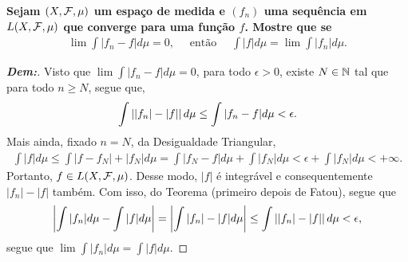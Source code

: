 \textbf{Sejam $(X, \mathcal F, \mu)$ um espaço de medida e $(f_n)$ uma sequência em 
$L(X, \mathcal F, \mu)$ que converge para uma função $f$. Mostre que se 
\begin{align*}
  \lim \int |f_n - f| d\mu = 0, \quad\text{ então }\quad \int |f| d\mu = \lim \int |f_n|d\mu.
\end{align*}}
\begin{proof}[\textbf{Dem:}] Visto que $\lim \int |f_n - f| d\mu = 0$, 
  para todo $\epsilon>0$, existe $N \in \mathbb N$ tal que para todo $n \ge N$,
  segue que, 
  \begin{align*}
    \int \left||f_n| - |f|\right| d\mu\le \int |f_n - f| d\mu < \epsilon.
  \end{align*}
  Mais ainda, fixado $n = N$, da Desigualdade Triangular,
  \begin{align*}
    \int |f| d\mu \le \int |f - f_N| + |f_N| d\mu = \int |f_N - f| d\mu + \int |f_N| d\mu
    < \epsilon + \int |f_N| d\mu < +\infty.
  \end{align*}
  Portanto, $f \in L(X, \mathcal F, \mu)$. Desse modo, $|f|$ é integrável e consequentemente
  $|f_n| - |f|$ também. Com isso, do Teorema (primeiro depois de Fatou), segue que
  \begin{align*}
    \left|\int |f_n| d\mu - \int |f| d\mu\right| = 
    \left|\int |f_n| - |f| d\mu\right| \le \int \left||f_n| - |f|\right| d\mu < \epsilon, 
  \end{align*}
  segue que $\lim \int |f_n| d\mu = \int |f| d\mu$.
\end{proof}

